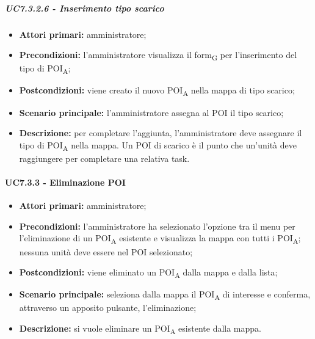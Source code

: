 \subparagraph{UC7.3.2.6 - Inserimento tipo scarico}

\begin{itemize}

   \item   \textbf{Attori primari:} amministratore;

   \item   \textbf{Precondizioni:} l'amministratore visualizza il form\textsubscript{G} per l'inserimento del tipo di POI\textsubscript{A};

   \item   \textbf{Postcondizioni:} viene creato il nuovo POI\textsubscript{A} nella mappa di tipo scarico; 

   \item   \textbf{Scenario principale:} l'amministratore assegna al POI il tipo scarico;

  \item   \textbf{Descrizione:} per completare l'aggiunta, l'amministratore deve assegnare il tipo di POI\textsubscript{A} nella mappa. Un POI di scarico è il punto che un'unità deve raggiungere per completare una relativa task.



\end{itemize}





\paragraph{UC7.3.3 - Eliminazione POI}

\begin{itemize}

   \item   \textbf{Attori primari:} amministratore;

   \item   \textbf{Precondizioni:} l'amministratore ha selezionato l'opzione tra il menu per l'eliminazione di un POI\textsubscript{A} esistente e visualizza la mappa con tutti i POI\textsubscript{A}; nessuna unità deve essere nel POI selezionato;

   \item   \textbf{Postcondizioni:} viene eliminato un POI\textsubscript{A} dalla mappa e dalla lista; 

   \item   \textbf{Scenario principale:} seleziona dalla mappa il POI\textsubscript{A} di interesse e conferma, attraverso un apposito pulsante, l'eliminazione;

   \item   \textbf{Descrizione:} si vuole eliminare un POI\textsubscript{A} esistente dalla mappa.

\end{itemize}

